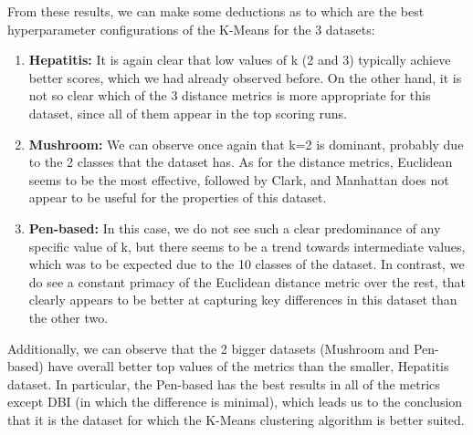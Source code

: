 From these results, we can make some deductions as to which are the best hyperparameter configurations of the K-Means for the 3 datasets:
\begin{enumerate}
    \item \textbf{Hepatitis:} It is again clear that low values of k (2 and 3) typically achieve better scores, which we had already observed before. On the other hand, it is not so clear which of the 3 distance metrics is more appropriate for this dataset, since all of them appear in the top scoring runs.
    \item \textbf{Mushroom:} We can observe once again that k=2 is dominant, probably due to the 2 classes that the dataset has. As for the distance metrics, Euclidean seems to be the most effective, followed by Clark, and Manhattan does not appear to be useful for the properties of this dataset.
    \item \textbf{Pen-based:} In this case, we do not see such a clear predominance of any specific value of k, but there seems to be a trend towards intermediate values, which was to be expected due to the 10 classes of the dataset. In contrast, we do see a constant primacy of the Euclidean distance metric over the rest, that clearly appears to be better at capturing key differences in this dataset than the other two.
\end{enumerate}
Additionally, we can observe that the 2 bigger datasets (Mushroom and Pen-based) have overall better top values of the metrics than the smaller, Hepatitis dataset. In particular, the Pen-based has the best results in all of the metrics except DBI (in which the difference is minimal), which leads us to the conclusion that it is the dataset for which the K-Means clustering algorithm is better suited.
